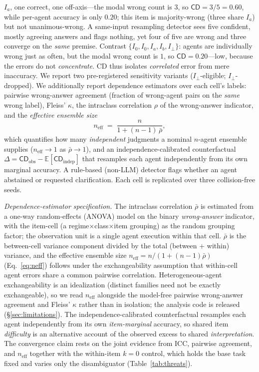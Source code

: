\documentclass[acmsmall,screen,review,anonymous]{acmart}
\newcommand{\cd}{\textsf{CD}}
\newcommand{\iperp}{\ensuremath{I_\perp}}
\newcommand{\neff}{\ensuremath{n_{\mathrm{eff}}}}
\begin{document}
$I_a$, one correct, one off-axis---the modal wrong count is $3$, so $\cd = 3/5 = 0.60$, while per-agent
accuracy is only $0.20$; this item is majority-wrong (three share $I_a$) but not unanimous-wrong. A
same-input resampling detector sees five confident, mostly agreeing answers and flags nothing, yet four of
five are wrong and three converge on the \emph{same} premise. Contrast $\{I_0, I_0, I_a, I_b, \iperp\}$:
agents are individually wrong just as often, but the modal wrong count is $1$, so $\cd = 0.20$---low, because
the errors do not \emph{concentrate}. \cd{} thus isolates \emph{correlated} error from mere inaccuracy.
We report two
pre-registered sensitivity variants (\iperp{}-eligible; \iperp{}-dropped). We additionally report dependence
estimators over each cell's labels: pairwise wrong-answer agreement (fraction of wrong-agent pairs on the
\emph{same} wrong label), Fleiss' $\kappa$, the intraclass
correlation $\rho$ of the wrong-answer indicator, and the \emph{effective ensemble size}
\begin{equation}
\label{eq:neff}
\neff \;=\; \frac{n}{1+(n-1)\,\bar\rho},
\end{equation}
which quantifies how many \emph{independent} judgments a nominal $n$-agent ensemble supplies ($\neff\!\to\!1$
as $\bar\rho\!\to\!1$), and an independence-calibrated counterfactual $\Delta = \cd_{\mathrm{obs}} -
\mathbb{E}[\cd_{\mathrm{indep}}]$ that resamples each agent independently from its own marginal accuracy. A
rule-based (non-LLM) detector flags whether an agent abstained or requested clarification. Each cell is
replicated over three collision-free seeds.

\emph{Dependence-estimator specification.} The intraclass correlation $\bar\rho$ is estimated from a one-way
random-effects (ANOVA) model on the binary \emph{wrong-answer} indicator, with the item-cell (a
regime$\times$class$\times$item grouping) as the random grouping factor; the observation unit is a single
agent execution within that cell. $\bar\rho$ is the between-cell variance component divided by the total
(between $+$ within) variance, and the effective ensemble size $\neff=n/(1+(n-1)\bar\rho)$ (Eq.~\ref{eq:neff})
follows under the exchangeability assumption that within-cell agent errors share a common pairwise
correlation. Heterogeneous-agent exchangeability is an idealization (distinct families need not
be exactly exchangeable), so we read $\neff$ alongside the model-free pairwise wrong-answer agreement and
Fleiss' $\kappa$ rather than in isolation; the analysis code is released (\S\ref{sec:limitations}). The
independence-calibrated counterfactual resamples each agent independently from its own \emph{item-marginal}
accuracy, so shared item \emph{difficulty} is an alternative account of the observed excess to shared
\emph{interpretation}. The convergence claim rests on the joint evidence from ICC, pairwise agreement, and
$\neff$ together with the within-item $k{=}0$ control, which holds the base task fixed and varies only the
disambiguator (Table~\ref{tab:threats}).
\end{document}
